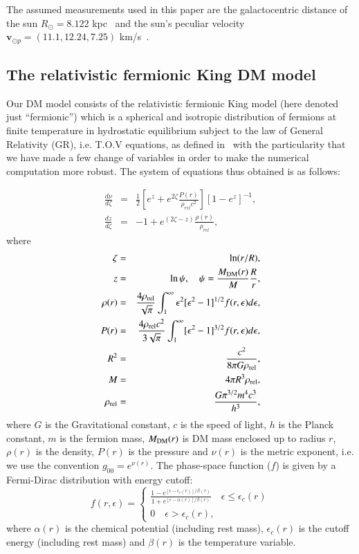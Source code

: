 \documentclass[twocolumn]{aa}
\begin{document}
The assumed measurements used in this paper are the
galactocentric distance of the sun $R_\odot=8.122$ kpc~\citep{2018A&A...615L..15G} and the sun's peculiar
velocity $\boldsymbol{v}_{\odot p} = (11.1, 12.24, 7.25)$ km/s~\citep{Shonrich}.


\subsection{The relativistic fermionic King DM model}
Our DM model consists of the relativistic fermionic King model (here denoted just ``fermionic'') which is a spherical and isotropic distribution of fermions at finite temperature in hydrostatic equilibrium subject to the law of General Relativity (GR), i.e. T.O.V equations, as defined in~\cite{arguelles_novel_2018} with the particularity that we have made a few change of variables in order to make the numerical computation more robust. The system of equations thus obtained is as follows:

\begin{eqnarray}
   \label{sode}
   \frac{d\nu}{d\zeta} & = & \frac{1}{2}\left[e^{z}+e^{2\zeta}\frac{P(r)}{\rho_{rel}c^2}\right][1-e^{z}]^{-1},\\
   \frac{dz}{d\zeta} & = &-1+e^{(2\zeta-z)}\frac{\rho(r)}{\rho_{rel}},
\end{eqnarray}
where
\begin{eqnarray}
   \zeta &=& \ln(r/R),\\
   z &=&\ln\psi,\quad \psi = \frac{M_{\rm{DM}}(r)}{M}\frac{R}{r},\label{mass_dm}\\
   \rho(r)&=&\frac{4\rho_{\rm rel}}{\sqrt{\pi}}\int^\infty_1\epsilon^2[\epsilon^2-1]^{1/2}f(r,\epsilon)d\epsilon,\\
   P(r)&=&\frac{4\rho_{\rm rel}c^2}{3\sqrt{\pi}}\int^\infty_1[\epsilon^2-1]^{3/2}f(r,\epsilon)d\epsilon,\\
   R^2 &=& \frac{c^2}{8\pi G \rho_{\rm{rel}}},\\
   M &=& 4\pi R^3 \rho_{\rm{rel}},\\
   \rho_{\rm{rel}}&=& \frac{ G\pi^{3/2} m^4 c^3}{h^3},
\end{eqnarray}
where $G$ is the Gravitational constant, $c$ is the speed of light, $h$ is the Planck constant, $m$ is the fermion mass, $M_{\rm{DM}}(r)$ is DM mass enclosed up to radius $r$, $\rho(r)$ is the density, $P(r)$ is the pressure and $\nu(r)$ is the metric exponent, i.e. we use the convention $g_{00}=e^{\nu(r)}$. The phase-space function ($f$) is given by a Fermi-Dirac distribution with energy cutoff:
\begin{equation}
f(r,\epsilon)=
   \begin{cases}
      \frac{\displaystyle{1-e^{[\epsilon-\epsilon_c(r)]/\beta(r)}}}
      {\displaystyle{1+e^{[\epsilon-\alpha(r)]/\beta(r)}}}\quad \epsilon \leq \epsilon_c(r)\\
      0\quad \epsilon > \epsilon_c(r),
   \end{cases}
\end{equation}
where $\alpha(r)$ is the chemical potential (including rest mass), $\epsilon_c(r)$ is the cutoff
energy (including rest mass) and $\beta(r)$ is the temperature variable.
\end{document}
